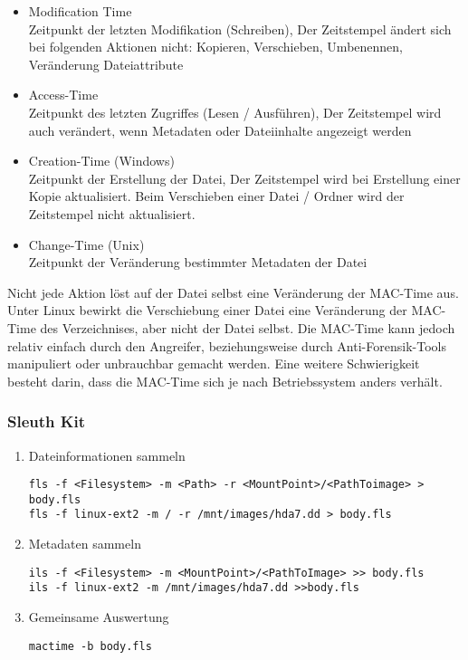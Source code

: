 \begin{itemize}
\item Modification Time\\
Zeitpunkt der letzten Modifikation (Schreiben), Der Zeitstempel ändert sich bei folgenden Aktionen nicht: Kopieren, Verschieben, Umbenennen, Veränderung Dateiattribute
\item Access-Time\\
Zeitpunkt des letzten Zugriffes (Lesen / Ausführen), Der Zeitstempel wird auch verändert, wenn Metadaten oder Dateiinhalte angezeigt werden
\item Creation-Time (Windows)\\
Zeitpunkt der Erstellung der Datei, Der Zeitstempel wird bei Erstellung einer Kopie aktualisiert. Beim Verschieben einer Datei / Ordner wird der Zeitstempel nicht aktualisiert.
\item Change-Time (Unix)\\
Zeitpunkt der Veränderung bestimmter Metadaten der Datei
\end{itemize}

Nicht jede Aktion löst auf der Datei selbst eine Veränderung der MAC-Time aus. Unter Linux bewirkt die Verschiebung einer Datei eine Veränderung der MAC-Time des Verzeichnises, aber nicht der Datei selbst. Die MAC-Time kann jedoch relativ einfach durch den Angreifer, beziehungsweise durch Anti-Forensik-Tools manipuliert oder unbrauchbar gemacht werden. Eine weitere Schwierigkeit besteht darin, dass die MAC-Time sich je nach Betriebssystem anders verhält.


\subsubsection{Sleuth Kit}
\begin{enumerate}
\item Dateinformationen sammeln
\begin{lstlisting}
fls -f <Filesystem> -m <Path> -r <MountPoint>/<PathToimage> > body.fls
fls -f linux-ext2 -m / -r /mnt/images/hda7.dd > body.fls
\end{lstlisting}

\item Metadaten sammeln
\begin{lstlisting}
ils -f <Filesystem> -m <MountPoint>/<PathToImage> >> body.fls
ils -f linux-ext2 -m /mnt/images/hda7.dd >>body.fls
\end{lstlisting}

\item Gemeinsame Auswertung
\begin{lstlisting}
mactime -b body.fls
\end{lstlisting}
\end{enumerate}



